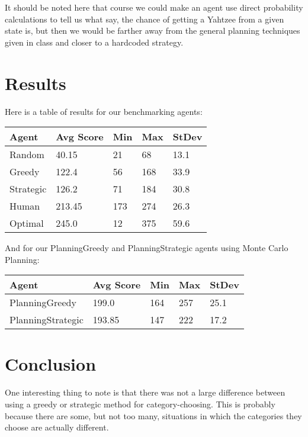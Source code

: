 \documentclass{article}
\begin{document}
It should be noted here that
course we could make an agent use direct probability calculations to tell us
what say, the chance of getting a Yahtzee from a given state is, but then we
would be farther away from the general planning techniques given in class and
closer to a hardcoded strategy.

\newpage

\section{Results}

Here is a table of results for our benchmarking agents:

\vspace{1em}

\begin{tabular}{ | l | l | l | l | l | }
\hline
Agent & Avg Score & Min & Max & StDev \\
\hline
Random & 40.15 & 21 & 68 & 13.1 \\
\hline
Greedy & 122.4 & 56 & 168 & 33.9 \\
\hline
Strategic & 126.2 & 71 & 184 & 30.8 \\
\hline
Human & 213.45 & 173 & 274 & 26.3 \\
\hline
Optimal & 245.0 & 12 & 375 & 59.6 \\
\hline
\end{tabular}

\vspace{2em}

And for our PlanningGreedy and PlanningStrategic agents using Monte Carlo
Planning:

\vspace{1em}

\begin{tabular}{ | l | l | l | l | l | }
\hline
Agent & Avg Score & Min & Max & StDev \\
\hline
PlanningGreedy & 199.0 & 164 & 257 & 25.1 \\
\hline
PlanningStrategic & 193.85 & 147 & 222 & 17.2 \\
\hline
\end{tabular}

\vspace{2em}

\section{Conclusion}

One interesting thing to note is that there was not a large difference between
using a greedy or strategic method for category-choosing. This is probably
because there are some, but not too many, situations in which the categories
they choose are actually different.
\end{document}
